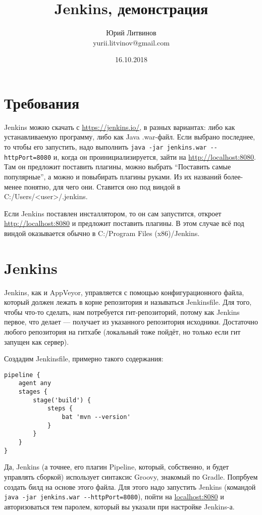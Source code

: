 \documentclass[a5paper]{article}
\title{Jenkins, демонстрация}
\author{Юрий Литвинов\\\small{yurii.litvinov@gmail.com}}
\date{16.10.2018}
\begin{document}
\maketitle
\thispagestyle{empty}

\section{Требования}

Jenkins можно скачать с \url{https://jenkins.io/}, в разных вариантах: либо как устанавливаемую программу, либо как Java .war-файл. Если выбрано последнее, то чтобы его запустить, надо выполнить \verb|java -jar jenkins.war --httpPort=8080| и, когда он проинициализируется, зайти на \url{http://localhost:8080}. Там он предложит поставить плагины, можно выбрать ``Поставить самые популярные'', а можно и повыбирать плагины руками. Из их названий более-менее понятно, для чего они. Ставится оно под виндой в C:/Users/<user>/.jenkins.

Если Jenkins поставлен инсталлятором, то он сам запустится, откроет \url{http://localhost:8080} и предложит поставить плагины. В этом случае всё под виндой оказывается обычно в C:/Program Files (x86)/Jenkins.

\section{Jenkins}

Jenkins, как и AppVeyor,  управляется с помощью конфигурационного файла, который должен лежать в корне репозитория и называться Jenkinsfile. Для того, чтобы что-то сделать, нам потребуется 
гит-репозиторий, потому как Jenkins первое, что делает --- получает из указанного репозитория исходники. Достаточно любого репозитория на гитхабе (локальный тоже пойдёт, но только если гит запущен как сервер).

Создадим Jenkinsfile, примерно такого содержания:

\begin{verbatim}
pipeline {
    agent any
    stages {
        stage('build') {
            steps {
                bat 'mvn --version'
            }
        }
    }
}
\end{verbatim}

Да, Jenkins (а точнее, его плагин Pipeline, который, собственно, и будет управлять сборкой) использует синтаксис Groovy, знакомый по Gradle. Попрбуем создать билд на основе этого файла. Для этого надо запустить Jenkins (командой \verb|java -jar jenkins.war --httpPort=8080|), пойти на \url{localhost:8080} и авторизоваться тем паролем, который вы указали при настройке Jenkins-а.
\end{document}
